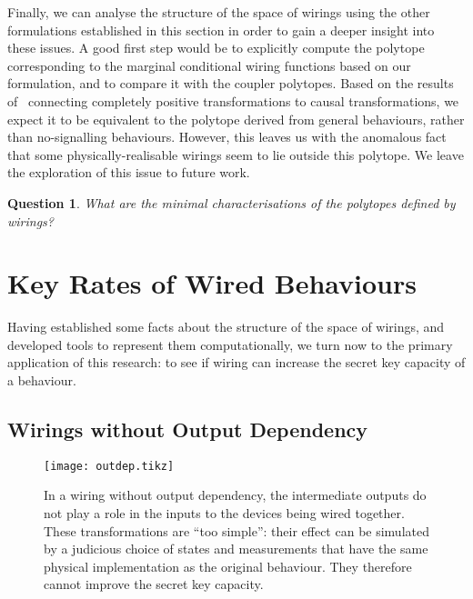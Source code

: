 \documentclass[10pt, a4paper]{article}
\numberwithin{equation}{section} %
\theoremstyle{definition}
\theoremstyle{plain}
\newtheorem{question}{Question}
\newcommand{\?}{\mathrel{?}} %
\begin{document}
                  Finally, we can analyse the structure of the space of wirings using the other formulations established in this section in order to gain a deeper insight into these issues. A good first step would be to explicitly compute the polytope corresponding to the marginal conditional wiring functions based on our formulation, and to compare it with the coupler polytopes. Based on the results of~\cite{LocalTransformations} connecting completely positive transformations to causal transformations, we expect it to be equivalent to the polytope derived from general behaviours, rather than no-signalling behaviours. However, this leaves us with the anomalous fact that some physically-realisable wirings seem to lie outside this polytope. We leave the exploration of this issue to future work.
                  \begin{question}
                    What are the minimal characterisations of the polytopes defined by wirings?
                  \end{question}

                  \section{Key Rates of Wired Behaviours}\label{sec:krwir}

                  Having established some facts about the structure of the space of wirings, and developed tools to represent them computationally, we turn now to the primary application of this research: to see if wiring can increase the secret key capacity of a behaviour.

                  \subsection{Wirings without Output Dependency}\label{sec:krwir_outdep}


              \begin{figure}
                \centering
                \texttt{[image: outdep.tikz]}
                \caption[Causal influences in a wiring without output dependency between two iid quantum behaviours.]{\label{fig:outdep} In a wiring without output dependency, the intermediate outputs do not play a role in the inputs to the devices being wired together. These transformations are ``too simple'': their effect can be simulated by a judicious choice of states and measurements that have the same physical implementation as the original behaviour. They therefore cannot improve the secret key capacity.}
              \end{figure}
\end{document}
